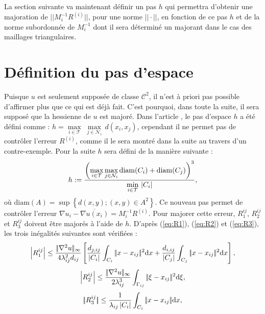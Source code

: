 \documentclass[12pt,a4paper]{article}
\begin{document}
	La section suivante va maintenant définir un pas $h$ qui permettra d'obtenir une majoration de $|\!|M_i^{-1}R^{(i)}|\!|$, pour une norme $|\!|\cdot|\!|$, en fonction de ce pas $h$ et de la norme subordonnée de $M_i^{-1}$ dont il sera déterminé un majorant dans le cas des maillages triangulaires.
	
	\section{Définition du pas d'espace}\label{sec:def_pas}
	
	Puisque $u$ est seulement supposée de classe $\mathcal C^2$, il n'est à priori pas possible d'affirmer plus que ce qui est déjà fait. C'est pourquoi, dans toute la suite, il sera supposé que la hessienne de $u$ est majoré.	Dans l'article \cite{ludo}, le pas d'espace $h$ a été défini comme : $h = \underset{i\in \mathcal T}\max\;\underset{j\in \mathcal N_i}\max\, d(x_i,x_j)$, cependant il ne permet pas de contrôler l'erreur $R^{(i)}$, comme il le sera montré dans la suite au travers d'un contre-exemple. Pour la suite $h$ sera défini de la manière suivante : 
	\begin{equation}\label{eq:def_pas}
			h := \dfrac{\left(\underset{i\in\mathcal T}\max\,\underset{j \in \mathcal N_i}\max\,\mathrm{diam}(C_i)+\mathrm{diam}(C_j)\right)^3}{\underset{i \in \mathcal T}\min\, \left\lvert C_i \right\rvert},
	\end{equation}
	où $\mathrm{diam}(A) = \sup\left\{d(x,y); (x,y)\in A^2\right\}$. Ce nouveau pas permet de contrôler l'erreur $\nabla u_i - \overline{\nabla u(x_i)} = M_i^{-1}R^{(i)}$. Pour majorer cette erreur, $R_1^{ij}$, $R_2^{ij}$ et $R_3^{ij}$ doivent être majorés à l'aide de $h$. D'après (\ref{eq:R1}), (\ref{eq:R2}) et (\ref{eq:R3}), les trois inégalités suivantes sont vérifiées :
	\begin{equation}\label{eq:maj_naiv_R1}
		\left\lvert R_1^{ij} \right\rvert \leq \frac {|\!|\nabla^2 u|\!|_\infty}{4\lambda_{ij}^2d_{ij}}\left[\frac{d_{j,ij}}{\left\lvert C_i \right\rvert}\displaystyle\int_{C_i} |\!| {x-x_{ij}}|\!|^2\mathrm d  x + \frac{d_{i,ij}}{\left\lvert C_j \right\rvert}\displaystyle\int_{C_j} |\!| {x-x_{ij}}|\!|^2\mathrm d  x\right],
	\end{equation}
	\begin{equation}\label{eq:maj_naiv_R2}
		\left\lvert R_2^{ij} \right\rvert \leq \frac{|\!|\nabla^2 u|\!|_\infty}{2\lambda_{ij}^3}\displaystyle\int_{\Gamma_{ij}} |\!| { \xi-x_{ij}}|\!|^2\mathrm d \xi,
	\end{equation}
	\begin{equation}\label{eq:maj_naiv_R3}
		|\!|R_3^{ij}|\!| \leq \frac1{\lambda_{ij}\left\lvert C_i \right\rvert}\int_{C_i}|\!| {x-  x_{ij}} |\!|\mathrm dx,
	\end{equation}
\end{document}
